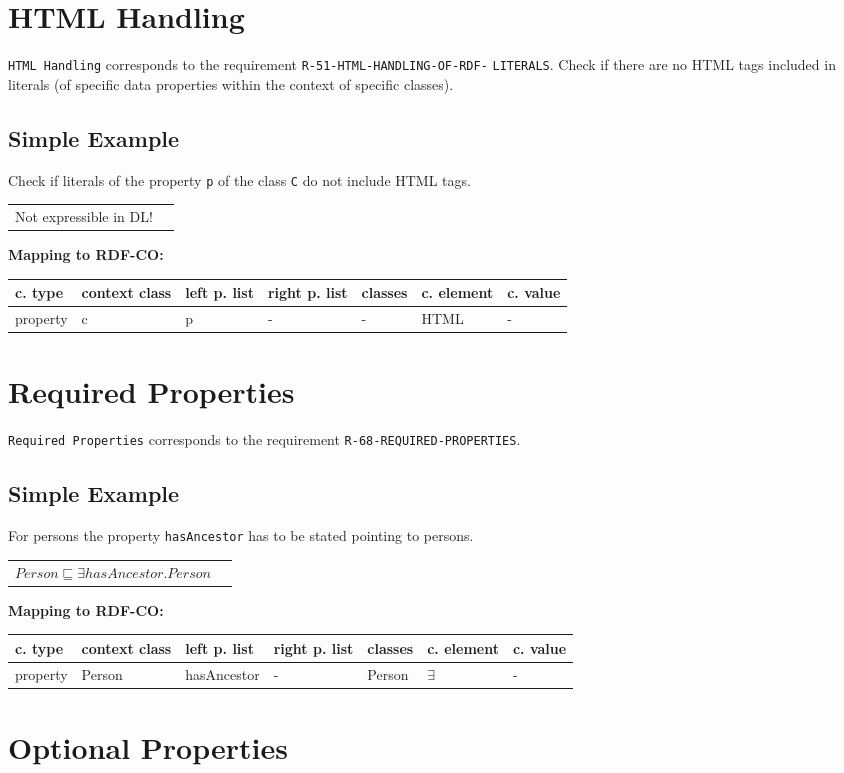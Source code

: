 \documentclass{llncs}
\newcommand{\ms}[1]{\texttt{#1}}
\newenvironment{gcotable}{
  \scriptsize
  \sffamily
  \vspace{0cm}
	\begin{center}
	\textbf{\vspace{0.4cm}Mapping to RDF-CO:} \\
  \begin{tabular}{l|l|l|l|l|l|l}
	\hline
  \textbf{c. type} & \textbf{context class} & \textbf{left p. list} & \textbf{right p. list} & \textbf{classes} & \textbf{c. element} & \textbf{c. value} \\
  \hline

}{
  \hline
  \end{tabular}
	\end{center}
}
\newenvironment{DL}{
  \vspace{0cm}
	\begin{center}
  \begin{tabular}{r l}

}{
  \end{tabular}
	\end{center}
}
\begin{document}
\section{HTML Handling}

\ms{HTML Handling} corresponds to the requirement
\ms{R-51-HTML-HANDLING-OF-RDF-} \ms{LITERALS}.
Check if there are no HTML tags included in literals (of specific data properties within the context of specific classes).

\subsection{Simple Example}

Check if literals of the property \ms{p} of the class \ms{C} do not include HTML tags.

\begin{DL}
Not expressible in DL!
\end{DL}

\begin{gcotable}
property & c & p & - & - & HTML & - \\
\end{gcotable}

\section{Required Properties}

\ms{Required Properties} corresponds to the requirement \ms{R-68-REQUIRED-PROPERTIES}.

\subsection{Simple Example}

For persons the property \ms{hasAncestor} has to be stated pointing to persons.

\begin{DL}
$Person \sqsubseteq \exists hasAncestor.Person$
\end{DL}

\begin{gcotable}
property & Person & hasAncestor & - & Person & $\exists$ & - \\
\end{gcotable}

\section{Optional Properties}
\end{document}
